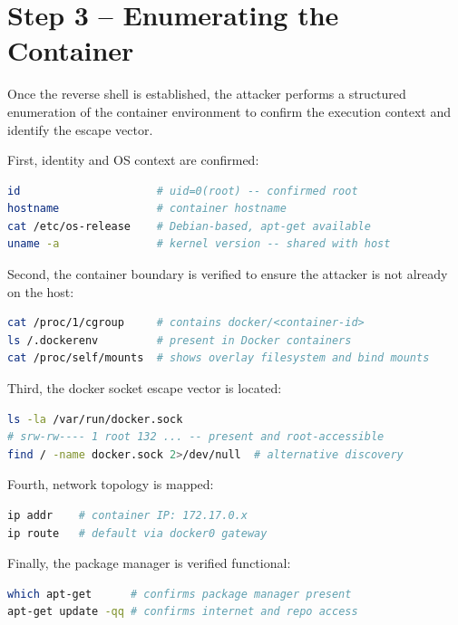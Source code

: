 \vspace{0.3cm}

\section{Step 3 -- Enumerating the Container}

Once the reverse shell is established, the attacker performs a structured enumeration of the container environment to confirm the execution context and identify the escape vector.

First, identity and OS context are confirmed:

\begin{lstlisting}[language=bash]
id                     # uid=0(root) -- confirmed root
hostname               # container hostname
cat /etc/os-release    # Debian-based, apt-get available
uname -a               # kernel version -- shared with host
\end{lstlisting}

Second, the container boundary is verified to ensure the attacker is not already on the host:

\begin{lstlisting}[language=bash]
cat /proc/1/cgroup     # contains docker/<container-id>
ls /.dockerenv         # present in Docker containers
cat /proc/self/mounts  # shows overlay filesystem and bind mounts
\end{lstlisting}

Third, the docker socket escape vector is located:

\begin{lstlisting}[language=bash]
ls -la /var/run/docker.sock
# srw-rw---- 1 root 132 ... -- present and root-accessible
find / -name docker.sock 2>/dev/null  # alternative discovery
\end{lstlisting}

Fourth, network topology is mapped:

\begin{lstlisting}[language=bash]
ip addr    # container IP: 172.17.0.x
ip route   # default via docker0 gateway
\end{lstlisting}

Finally, the package manager is verified functional:

\begin{lstlisting}[language=bash]
which apt-get      # confirms package manager present
apt-get update -qq # confirms internet and repo access
\end{lstlisting}


